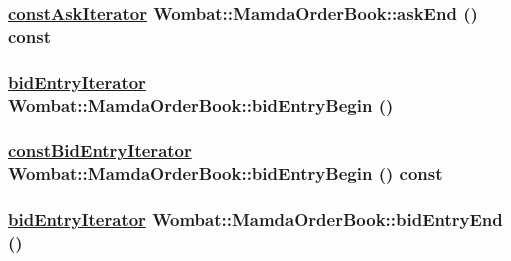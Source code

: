 \hypertarget{classWombat_1_1MamdaOrderBook_34287a045850ebb23f5671e4d2d0a487}{
\subsubsection[askEnd]{\setlength{\rightskip}{0pt plus 5cm}\hyperlink{classWombat_1_1MamdaOrderBook_1_1askIterator}{const\-Ask\-Iterator} Wombat::Mamda\-Order\-Book::ask\-End () const}}
\label{classWombat_1_1MamdaOrderBook_34287a045850ebb23f5671e4d2d0a487}


\hypertarget{classWombat_1_1MamdaOrderBook_a3d424fefe6684e170048cb653eef1fb}{
\subsubsection[bidEntryBegin]{\setlength{\rightskip}{0pt plus 5cm}\hyperlink{classWombat_1_1MamdaOrderBook_1_1bidEntryIterator}{bid\-Entry\-Iterator} Wombat::Mamda\-Order\-Book::bid\-Entry\-Begin ()}}
\label{classWombat_1_1MamdaOrderBook_a3d424fefe6684e170048cb653eef1fb}


\hypertarget{classWombat_1_1MamdaOrderBook_7731fa4f9edca3a157253b5200854735}{
\subsubsection[bidEntryBegin]{\setlength{\rightskip}{0pt plus 5cm}\hyperlink{classWombat_1_1MamdaOrderBook_1_1bidEntryIterator}{const\-Bid\-Entry\-Iterator} Wombat::Mamda\-Order\-Book::bid\-Entry\-Begin () const}}
\label{classWombat_1_1MamdaOrderBook_7731fa4f9edca3a157253b5200854735}


\hypertarget{classWombat_1_1MamdaOrderBook_8649cdeddccb23cf9f489e265ce2f96b}{
\subsubsection[bidEntryEnd]{\setlength{\rightskip}{0pt plus 5cm}\hyperlink{classWombat_1_1MamdaOrderBook_1_1bidEntryIterator}{bid\-Entry\-Iterator} Wombat::Mamda\-Order\-Book::bid\-Entry\-End ()}}
\label{classWombat_1_1MamdaOrderBook_8649cdeddccb23cf9f489e265ce2f96b}


